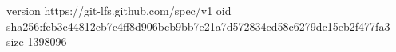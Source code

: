 version https://git-lfs.github.com/spec/v1
oid sha256:feb3c44812cb7c4ff8d906bcb9bb7e21a7d572834cd58c6279dc15eb2f477fa3
size 1398096
